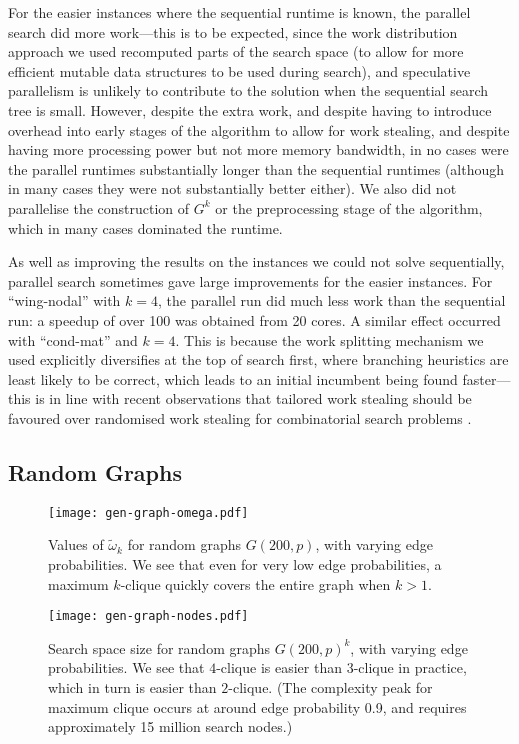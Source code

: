 \documentclass[letterpaper]{article}
\begin{document}
For the easier instances where the sequential runtime is known, the parallel search did more
work---this is to be expected, since the work distribution approach we used recomputed parts of the
search space (to allow for more efficient mutable data structures to be used during search), and
speculative parallelism is unlikely to contribute to the solution when the sequential search tree is
small. However, despite the extra work, and despite having to introduce overhead into early stages
of the algorithm to allow for work stealing, and despite having more processing power but not more
memory bandwidth, in no cases were the parallel runtimes substantially longer than the sequential
runtimes (although in many cases they were not substantially better either). We also did not
parallelise the construction of $G^k$ or the preprocessing stage of the algorithm, which in many
cases dominated the runtime.

As well as improving the results on the instances we could not solve sequentially, parallel search
sometimes gave large improvements for the easier instances. For ``wing-nodal'' with $k=4$, the
parallel run did much less work than the sequential run: a speedup of over 100 was obtained from 20
cores. A similar effect occurred with ``cond-mat'' and $k=4$. This is because the work splitting
mechanism we used explicitly diversifies at the top of search first, where branching heuristics are
least likely to be correct, which leads to an initial incumbent being found faster---this is in line
with recent observations that tailored work stealing should be favoured over randomised work
stealing for combinatorial search problems
\cite{DBLP:conf/cp/ChuSS09,DBLP:journals/topc/McCreeshP15}.

\subsection{Random Graphs}

\begin{figure}[h!] %
    \centering
    \texttt{[image: gen-graph-omega.pdf]}
    \caption{Values of $\tilde{\omega}_k$ for random graphs $G(200, p)$, with varying edge probabilities.
        We see that even for very low edge probabilities, a maximum $k$-clique
    quickly covers the entire graph when $k > 1$.}
    \label{figure:graph-omega}
\end{figure}

\begin{figure}[h!] %
    \centering
    \texttt{[image: gen-graph-nodes.pdf]}
    \caption{Search space size for random graphs $G(200, p)^k$, with varying edge probabilities. We see that
        $4$-clique is easier than $3$-clique in practice, which in turn is easier than $2$-clique. (The
        complexity peak for maximum clique occurs at around edge probability 0.9, and requires
        approximately 15 million search nodes.)}
    \label{figure:graph-nodes}
\end{figure}
\end{document}
